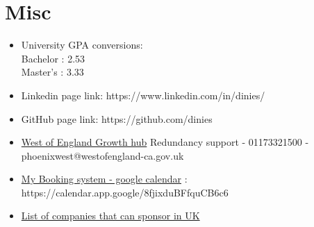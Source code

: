 \section*{Misc}
\begin{itemize}
  \item University GPA conversions: \\ Bachelor : 2.53 \\ Master's :  3.33
  \item Linkedin page link:
https://www.linkedin.com/in/dinies/ 
  \item GitHub page link:
https://github.com/dinies
\item
    \href{https://www.westofengland-ca.gov.uk/what-we-do/employment-skills/phoenix-west/}
    {West of England Growth hub} Redundancy support - 01173321500 - phoenixwest@westofengland-ca.gov.uk

\item
    \href{https://calendar.app.google/9fjixduBFfquCB6c6}
    {My Booking system - google calendar} : \\
    https://calendar.app.google/8fjixduBFfquCB6c6
\item
    \href{https://www.gov.uk/government/publications/register-of-licensed-sponsors-workers}
    {List of companies that can sponsor in UK}
\end{itemize}


